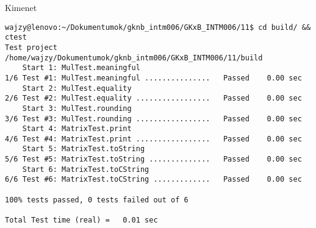 \begin{frame}
  \begin{exampleblock}{}
    \scriptsize
    
  \end{exampleblock}
\end{frame}

\begin{frame}[fragile]
  \begin{block}{Kimenet}
    \scriptsize
    \vspace{-.5cm}
    \begin{verbatim}
wajzy@lenovo:~/Dokumentumok/gknb_intm006/GKxB_INTM006/11$ cd build/ && ctest 
Test project /home/wajzy/Dokumentumok/gknb_intm006/GKxB_INTM006/11/build
    Start 1: MulTest.meaningful
1/6 Test #1: MulTest.meaningful ...............   Passed    0.00 sec
    Start 2: MulTest.equality
2/6 Test #2: MulTest.equality .................   Passed    0.00 sec
    Start 3: MulTest.rounding
3/6 Test #3: MulTest.rounding .................   Passed    0.00 sec
    Start 4: MatrixTest.print
4/6 Test #4: MatrixTest.print .................   Passed    0.00 sec
    Start 5: MatrixTest.toString
5/6 Test #5: MatrixTest.toString ..............   Passed    0.00 sec
    Start 6: MatrixTest.toCString
6/6 Test #6: MatrixTest.toCString .............   Passed    0.00 sec

100% tests passed, 0 tests failed out of 6

Total Test time (real) =   0.01 sec
\end{verbatim}
    \vspace{-.4cm}
  \end{block}
\end{frame}

